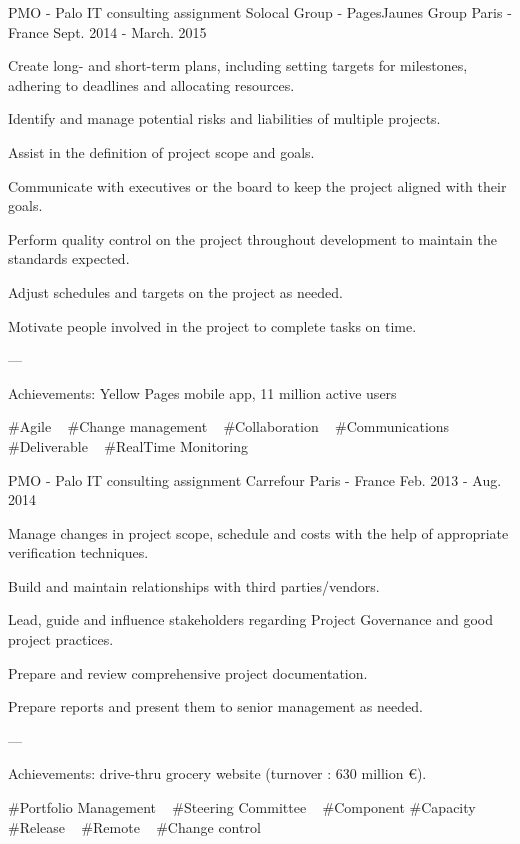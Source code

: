 \begin{cventries}
  \cventry
    {PMO - Palo IT consulting assignment} %
    {Solocal Group - PagesJaunes Group} %
    {Paris - France} %
    {Sept. 2014 - March. 2015} %
    {
      \begin{cvitems} %
        \item {Create long- and short-term plans, including setting targets for milestones, adhering to deadlines and allocating resources.}
        \item {Identify and manage potential risks and liabilities of multiple projects.}
        \item {Assist in the definition of project scope and goals.}
        \item {Communicate with executives or the board to keep the project aligned with their goals.}
        \item {Perform quality control on the project throughout development to maintain the standards expected.}
        \item {Adjust schedules and targets on the project as needed.}
        \item {Motivate people involved in the project to complete tasks on time.}
        \item {---}
        \item {Achievements: Yellow Pages mobile app, 11 million active users}
      \end{cvitems}
    }
    {
      \#Agile ~
      \#Change management ~
      \#Collaboration ~
      \#Communications ~
      \#Deliverable ~
      \#RealTime Monitoring ~
    }

  \cventry
    {PMO - Palo IT consulting assignment} %
    {Carrefour} %
    {Paris - France} %
    {Feb. 2013 - Aug. 2014} %
    {
      \begin{cvitems} %
        \item {Manage changes in project scope, schedule and costs with the help of appropriate verification techniques.}
        \item {Build and maintain relationships with third parties/vendors.}
        \item {Lead, guide and influence stakeholders regarding Project Governance and good project practices.}
        \item {Prepare and review comprehensive project documentation.}
        \item {Prepare reports and present them to senior management as needed.}
        \item {---}
        \item {Achievements: drive-thru grocery website (turnover : 630 million €).}
      \end{cvitems}
    }
    {
      \#Portfolio Management ~
      \#Steering Committee ~
      \#Component
      \#Capacity
      \#Release ~
      \#Remote ~
      \#Change control ~
    }


\end{cventries}
